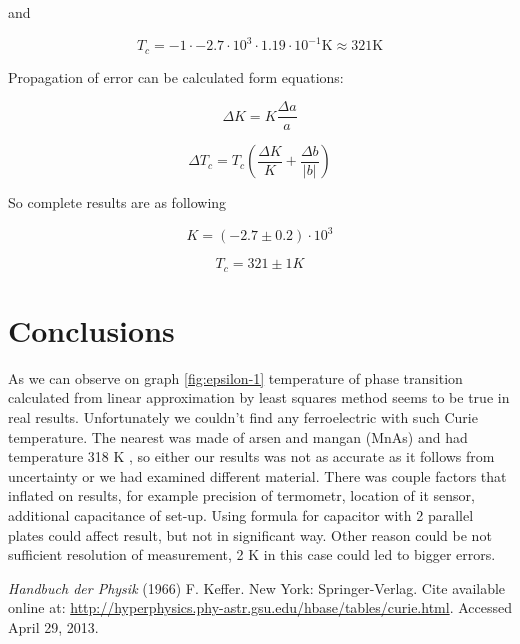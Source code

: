 \documentclass[a4paper,12pt]{article}
\begin{document}
    and 

    \begin{displaymath}
        T_c = -1 \cdot -2.7 \cdot 10^3 \cdot 1.19 \cdot 10^{-1} \mathrm{K} \approx 321 \mathrm{K}
    \end{displaymath}

    Propagation of error can be calculated form equations: 

    \begin{equation}
        \Delta K = K \frac{\Delta a}{a}
    \end{equation}
    
    \begin{equation}
        \Delta T_c = T_c \left( \frac{\Delta K}{K} + \frac{\Delta b}{|b|} \right)
    \end{equation}
    
    So complete results are as following

    \begin{displaymath}
        K = (-2.7 \pm 0.2) \cdot 10^3
    \end{displaymath}
    
    \begin{displaymath}
        T_c = 321 \pm 1 K
    \end{displaymath}
    


    \section{Conclusions}

    As we can observe on graph \ref{fig:epsilon-1} temperature of phase transition calculated from linear approximation by least squares method seems to be true in real results. Unfortunately we couldn't find any ferroelectric with such Curie temperature. The nearest was made of arsen and mangan (MnAs) and had temperature 318 K \cite{res}, so either our results was not as accurate as it follows from uncertainty or we had examined different material. There was couple factors that inflated on results, for example precision of termometr, location of it sensor, additional capacitance of set-up. Using formula for capacitor with 2 parallel plates could affect result, but not in significant way. Other reason could be not sufficient resolution of measurement, 2 K in this case could led to bigger errors.  

    \begin{thebibliography}{9}


        \emph{Handbuch der Physik} (1966) F. Keffer. New York: Springer-Verlag. Cite available online at: \url{http://hyperphysics.phy-astr.gsu.edu/hbase/tables/curie.html}. Accessed April 29, 2013.

    \end{thebibliography}
\end{document}
